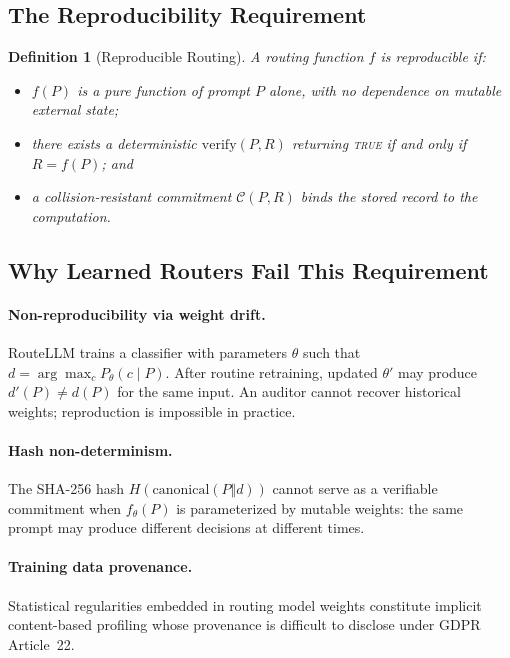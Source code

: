 \documentclass[11pt,a4paper]{article}
\newtheorem{definition}[theorem]{Definition}
\begin{document}
\subsection{The Reproducibility Requirement}

\begin{definition}[Reproducible Routing]
A routing function $f$ is \emph{reproducible} if:
\begin{itemize}
  \item[(i)] $f(P)$ is a pure function of prompt $P$ alone, with no dependence on
    mutable external state;
  \item[(ii)] there exists a deterministic $\mathrm{verify}(P, R)$ returning
    \textsc{true} if and only if $R = f(P)$; and
  \item[(iii)] a collision-resistant commitment $\mathcal{C}(P, R)$ binds the
    stored record to the computation.
\end{itemize}
\end{definition}

\subsection{Why Learned Routers Fail This Requirement}

\paragraph{Non-reproducibility via weight drift.}
RouteLLM trains a classifier with parameters $\theta$ such that
$d = \arg\max_c P_\theta(c \mid P)$. After routine retraining, updated $\theta'$
may produce $d'(P) \neq d(P)$ for the same input. An auditor cannot recover
historical weights; reproduction is impossible in practice.

\paragraph{Hash non-determinism.}
The SHA-256 hash $H(\mathrm{canonical}(P \Vert d))$ cannot serve as a verifiable
commitment when $f_\theta(P)$ is parameterized by mutable weights: the same prompt
may produce different decisions at different times.

\paragraph{Training data provenance.}
Statistical regularities embedded in routing model weights constitute implicit
content-based profiling whose provenance is difficult to disclose under GDPR
Article~22.
\end{document}
